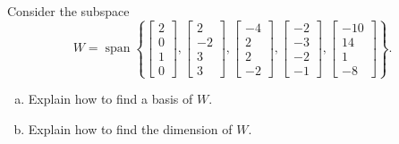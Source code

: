 
\begin{exerciseStatement}


Consider the subspace \[W=\operatorname{span}  \left\{ \left[\begin{array}{c}
2 \\
0 \\
1 \\
0
\end{array}\right] , \left[\begin{array}{c}
2 \\
-2 \\
3 \\
3
\end{array}\right] , \left[\begin{array}{c}
-4 \\
2 \\
2 \\
-2
\end{array}\right] , \left[\begin{array}{c}
-2 \\
-3 \\
-2 \\
-1
\end{array}\right] , \left[\begin{array}{c}
-10 \\
14 \\
1 \\
-8
\end{array}\right] \right\} .\]


\begin{enumerate}[(a)]
\item  Explain how to find a basis of \(W\).
\item  Explain how to find the dimension of \(W\).
\end{enumerate}
    
\end{exerciseStatement}
    
